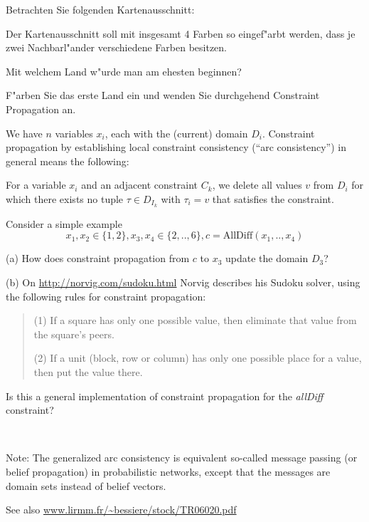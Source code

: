 
Betrachten Sie folgenden Kartenausschnitt:


Der Kartenausschnitt soll mit insgesamt 4 Farben so eingef"arbt werden, dass je zwei Nachbarl"ander verschiedene Farben besitzen.

Mit welchem Land w"urde man am ehesten beginnen?

F"arben Sie das erste Land ein und wenden Sie durchgehend Constraint Propagation an.



We have $n$ variables $x_i$, each with the (current) domain
$D_i$. Constraint propagation by establishing local constraint
consistency (``arc consistency'') in general means the following:

For a variable $x_i$ and an adjacent constraint $C_k$, we delete all
values $v$ from $D_i$ for which there exists no tuple $\tau \in D_{I_k}$
with $\tau_i=v$ that satisfies the constraint.

Consider a simple example
$$x_1,x_2 \in \{1,2\}\comma x_3, x_4 \in\{2,..,6\}\comma
c = \text{AllDiff}(x_1,..,x_4)$$

(a) How does constraint propagation from $c$ to $x_3$ update the domain $D_3$?

(b) On \url{http://norvig.com/sudoku.html} Norvig describes his Sudoku
solver, using the following rules for constraint propagation:
\begin{quote}
(1) If a square has only one possible value, then eliminate that value
from the square's peers.

(2) If a unit (block, row or column) has only one possible place for a
value, then put the value there.
\end{quote}
Is this a general implementation of constraint propagation for
the \emph{allDiff} constraint?

~

Note: The generalized arc consistency is equivalent so-called message
passing (or belief propagation) in probabilistic networks, except that
the messages are domain sets instead of belief vectors.

See also \url{www.lirmm.fr/~bessiere/stock/TR06020.pdf}



\exerfoot

